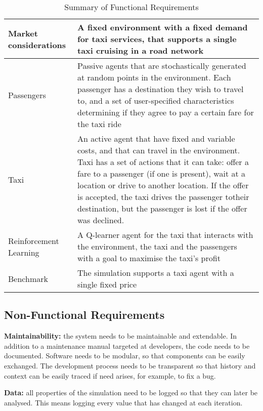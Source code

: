 \begin{table}
\begin{tabular}{| p{} | p{} |}
  \hline
  
  Market considerations & A fixed environment with a fixed demand for taxi
  services, that supports a single taxi cruising in a road network \\ \hline

  Passengers & Passive agents that are stochastically generated at random
  points in the environment. Each passenger has a destination they wish to
  travel to, and a set of user-specified characteristics determining if they
  agree to pay a certain fare for the taxi ride \\ \hline

  Taxi & An active agent that have fixed and variable costs, and that can travel
  in the environment. Taxi has a set of actions that it can take: offer a fare
  to a passenger (if one is present), wait at a location or drive to another
  location. If the offer is accepted, the taxi drives the passenger totheir
  destination, but the passenger is lost if the offer was declined. \\ \hline

  Reinforcement Learning & A Q-learner agent for the taxi that interacts with
  the environment, the taxi and the passengers with a goal to maximise the
  taxi's profit \\ \hline

  Benchmark & The simulation supports a taxi agent with a single fixed price \\
  \hline
\end{tabular}
\caption{
  Summary of Functional Requirements
  \label{table:requirements}
}
\end{table}

\subsection{Non-Functional Requirements}

\textbf{Maintainability:} the system needs to be maintainable and extendable.
In addition to a maintenance manual targeted at developers, the code needs to
be documented. Software needs to be modular, so that components can be easily
exchanged. The development process needs to be transparent so that history and
context can be easily traced if need arises, for example, to fix a bug.

\textbf{Data:} all properties of the simulation need to be logged so that they
can later be analysed. This means logging every value that has changed at each
iteration.
